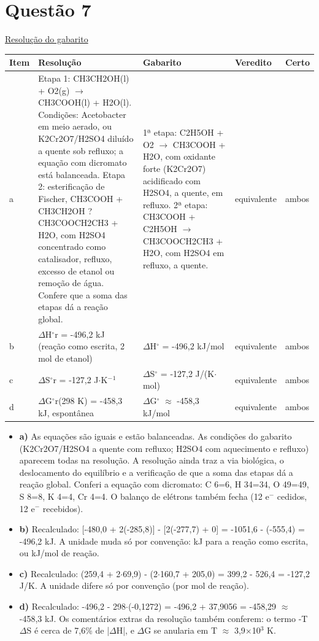 \documentclass{article}%
\begin{document}
\section*{Questão 7}%
\href{https://poliedroresolve.sistemapoliedro.com.br/vestibulares/ita/2027/ita-2-fase-dia-2-21-10-2026-2-fase-dia-2/dissertativa-7-quimica-2-fase-dia-2-ita-2027}{Resolução do gabarito}\par\smallskip%
\begin{longtable}{@{}p{} p{} p{} p{} p{}@{}}\toprule Item & Resolução & Gabarito & Veredito & Certo \\ \midrule
a & Etapa 1: CH3CH2OH(l) + O2(g) $\to$ CH3COOH(l) + H2O(l). Condições: Acetobacter em meio aerado, ou K2Cr2O7/H2SO4 diluído a quente sob refluxo; a equação com dicromato está balanceada. Etapa 2: esterificação de Fischer, CH3COOH + CH3CH2OH ? CH3COOCH2CH3 + H2O, com H2SO4 concentrado como catalisador, refluxo, excesso de etanol ou remoção de água. Confere que a soma das etapas dá a reação global. & 1ª etapa: C2H5OH + O2 $\to$ CH3COOH + H2O, com oxidante forte (K2Cr2O7) acidificado com H2SO4, a quente, em refluxo. 2ª etapa: CH3COOH + C2H5OH $\to$ CH3COOCH2CH3 + H2O, com H2SO4 em refluxo, a quente. & equivalente & ambos \\
b & $\Delta$H$^\circ$r = -496,2 kJ (reação como escrita, 2 mol de etanol) & $\Delta$H$^\circ$ = -496,2 kJ/mol & equivalente & ambos \\
c & $\Delta$S$^\circ$r = -127,2 J$\cdot$K$^{-}$$^{1}$ & $\Delta$S$^\circ$ = -127,2 J/(K$\cdot$mol) & equivalente & ambos \\
d & $\Delta$G$^\circ$r(298 K) = -458,3 kJ, espontânea & $\Delta$G$^\circ$ $\approx$ -458,3 kJ/mol & equivalente & ambos \\
\bottomrule\end{longtable}%
\begin{itemize}%
\item%
\textbf{a)} As equações são iguais e estão balanceadas. As condições do gabarito (K2Cr2O7/H2SO4 a quente com refluxo; H2SO4 com aquecimento e refluxo) aparecem todas na resolução. A resolução ainda traz a via biológica, o deslocamento do equilíbrio e a verificação de que a soma das etapas dá a reação global. Conferi a equação com dicromato: C 6=6, H 34=34, O 49=49, S 8=8, K 4=4, Cr 4=4. O balanço de elétrons também fecha (12 e$^{-}$ cedidos, 12 e$^{-}$ recebidos).%
\item%
\textbf{b)} Recalculado: {[}-480,0 + 2(-285,8){]} - {[}2(-277,7) + 0{]} = -1051,6 - (-555,4) = -496,2 kJ. A unidade muda só por convenção: kJ para a reação como escrita, ou kJ/mol de reação.%
\item%
\textbf{c)} Recalculado: (259,4 + 2$\cdot$69,9) - (2$\cdot$160,7 + 205,0) = 399,2 - 526,4 = -127,2 J/K. A unidade difere só por convenção (por mol de reação).%
\item%
\textbf{d)} Recalculado: -496,2 - 298$\cdot$(-0,1272) = -496,2 + 37,9056 = -458,29 $\approx$ -458,3 kJ. Os comentários extras da resolução também conferem: o termo -T$\Delta$S é cerca de 7,6\% de |$\Delta$H|, e $\Delta$G se anularia em T $\approx$ 3,9$\times$10$^3$ K.%
\end{itemize}%
\end{document}
